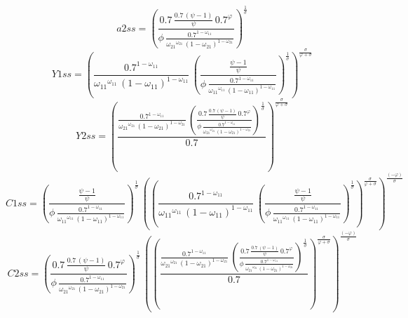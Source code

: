 \begin{dmath*}
a2ss = \left(\frac{0.7\, \frac{0.7\, \left({{\psi}}-1\right)}{{{\psi}}}\, 0.7^{{{\varphi}}}}{{{\phi}}\, \frac{0.7^{1-{{\omega_{11}}}}}{{{\omega_{21}}}^{{{\omega_{21}}}}\, \left(1-{{\omega_{21}}}\right)^{1-{{\omega_{21}}}}}}\right)^{\frac{1}{{{\sigma}}}}
\end{dmath*}
\begin{dmath*}
Y1ss = \left(\frac{0.7^{1-{{\omega_{11}}}}}{{{\omega_{11}}}^{{{\omega_{11}}}}\, \left(1-{{\omega_{11}}}\right)^{1-{{\omega_{11}}}}}\, \left(\frac{\frac{{{\psi}}-1}{{{\psi}}}}{{{\phi}}\, \frac{0.7^{1-{{\omega_{11}}}}}{{{\omega_{11}}}^{{{\omega_{11}}}}\, \left(1-{{\omega_{11}}}\right)^{1-{{\omega_{11}}}}}}\right)^{\frac{1}{{{\sigma}}}}\right)^{\frac{{{\sigma}}}{{{\varphi}}+{{\sigma}}}}
\end{dmath*}
\begin{dmath*}
Y2ss = \left(\frac{\frac{0.7^{1-{{\omega_{11}}}}}{{{\omega_{21}}}^{{{\omega_{21}}}}\, \left(1-{{\omega_{21}}}\right)^{1-{{\omega_{21}}}}}\, \left(\frac{0.7\, \frac{0.7\, \left({{\psi}}-1\right)}{{{\psi}}}\, 0.7^{{{\varphi}}}}{{{\phi}}\, \frac{0.7^{1-{{\omega_{11}}}}}{{{\omega_{21}}}^{{{\omega_{21}}}}\, \left(1-{{\omega_{21}}}\right)^{1-{{\omega_{21}}}}}}\right)^{\frac{1}{{{\sigma}}}}}{0.7}\right)^{\frac{{{\sigma}}}{{{\varphi}}+{{\sigma}}}}
\end{dmath*}
\begin{dmath*}
C1ss = \left(\frac{\frac{{{\psi}}-1}{{{\psi}}}}{{{\phi}}\, \frac{0.7^{1-{{\omega_{11}}}}}{{{\omega_{11}}}^{{{\omega_{11}}}}\, \left(1-{{\omega_{11}}}\right)^{1-{{\omega_{11}}}}}}\right)^{\frac{1}{{{\sigma}}}}\, \left(\left(\frac{0.7^{1-{{\omega_{11}}}}}{{{\omega_{11}}}^{{{\omega_{11}}}}\, \left(1-{{\omega_{11}}}\right)^{1-{{\omega_{11}}}}}\, \left(\frac{\frac{{{\psi}}-1}{{{\psi}}}}{{{\phi}}\, \frac{0.7^{1-{{\omega_{11}}}}}{{{\omega_{11}}}^{{{\omega_{11}}}}\, \left(1-{{\omega_{11}}}\right)^{1-{{\omega_{11}}}}}}\right)^{\frac{1}{{{\sigma}}}}\right)^{\frac{{{\sigma}}}{{{\varphi}}+{{\sigma}}}}\right)^{\frac{\left(-{{\varphi}}\right)}{{{\sigma}}}}
\end{dmath*}
\begin{dmath*}
C2ss = \left(\frac{0.7\, \frac{0.7\, \left({{\psi}}-1\right)}{{{\psi}}}\, 0.7^{{{\varphi}}}}{{{\phi}}\, \frac{0.7^{1-{{\omega_{11}}}}}{{{\omega_{21}}}^{{{\omega_{21}}}}\, \left(1-{{\omega_{21}}}\right)^{1-{{\omega_{21}}}}}}\right)^{\frac{1}{{{\sigma}}}}\, \left(\left(\frac{\frac{0.7^{1-{{\omega_{11}}}}}{{{\omega_{21}}}^{{{\omega_{21}}}}\, \left(1-{{\omega_{21}}}\right)^{1-{{\omega_{21}}}}}\, \left(\frac{0.7\, \frac{0.7\, \left({{\psi}}-1\right)}{{{\psi}}}\, 0.7^{{{\varphi}}}}{{{\phi}}\, \frac{0.7^{1-{{\omega_{11}}}}}{{{\omega_{21}}}^{{{\omega_{21}}}}\, \left(1-{{\omega_{21}}}\right)^{1-{{\omega_{21}}}}}}\right)^{\frac{1}{{{\sigma}}}}}{0.7}\right)^{\frac{{{\sigma}}}{{{\varphi}}+{{\sigma}}}}\right)^{\frac{\left(-{{\varphi}}\right)}{{{\sigma}}}}
\end{dmath*}
